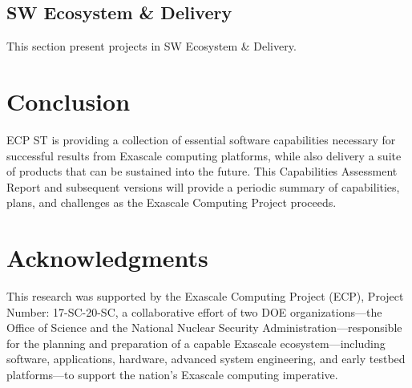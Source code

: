\documentclass{ecpreport-publicv1}
\newcommand{\ecosystem}{SW Ecosystem \& Delivery}
\begin{document}
\subsection{\ecosystem}
This section present projects in \ecosystem.
\newpage

\newpage

\newpage

\newpage

\newpage

\newpage

\newpage


\newpage
\section{Conclusion}

ECP ST is providing a collection of essential software capabilities necessary for successful results from Exascale computing platforms, while also delivery a suite of products that can be sustained into the future.  This Capabilities Assessment Report and subsequent versions will provide a periodic summary of capabilities, plans, and challenges as the Exascale Computing Project proceeds.
\newpage
\section*{Acknowledgments}

This research was supported by the Exascale Computing Project (ECP), Project
Number: 17-SC-20-SC, a collaborative effort of two DOE organizations---the
Office of Science and the National Nuclear Security
Administration---responsible for the planning and preparation of a capable
Exascale ecosystem---including software, applications, hardware, advanced
system engineering, and early testbed platforms---to support the nation's
Exascale computing imperative.
\end{document}
